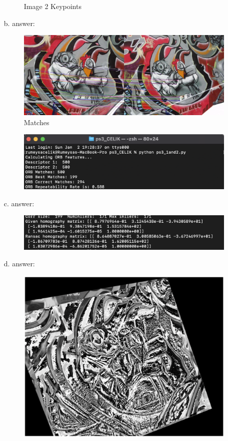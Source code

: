 \documentclass[a4paper, 12pt]{report}
\begin{document}
\begin{itemize}
\begin{figure}[h]
\caption{Image 2 Keypoints}
\end{figure}
\newpage
\item[b.] answer:
\begin{figure}
\includegraphics[scale=.43]{3.png}
\centering
\caption{Matches}
\end{figure}
\begin{figure}[h]
\includegraphics[scale=.53]{4.png}
\centering
\end{figure}
\item[c.] answer:
\begin{figure}[h]
\includegraphics[scale=.53]{5.png}
\centering
\end{figure}
\newpage
\item[d.] answer:
\begin{figure}[h]
\includegraphics[scale=.43]{6.png}

\end{figure}
\end{itemize}
\end{document}
